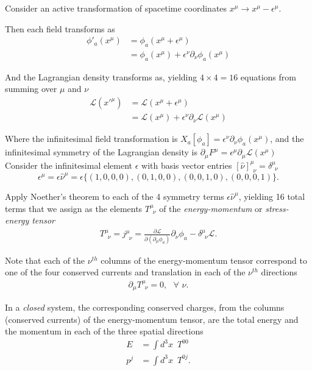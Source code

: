 \noindent Consider an active transformation of spacetime coordinates $x^\mu \rightarrow x^\mu - \epsilon^\mu$.

\noindent Then each field transforms as
\begin{align}
\phi'_a(x^\mu) &= \phi_a(x^\mu + \epsilon^\mu) \\
&= \phi_a(x^\mu) + \epsilon^\nu \partial_\nu \phi_a(x^\mu)
\end{align}

\noindent And the Lagrangian density transforms as, yielding $4 \times 4=16$ equations from summing over $\mu$ and $\nu$ 
\begin{align}
\mathscr{L}(x'^\mu) &= \mathscr{L} (x^\mu + \epsilon^\mu) \\
&= \mathscr{L}(x^\mu) + \epsilon^\nu \partial_\nu \mathscr{L}(x^\mu)
\end{align}

\noindent Where the infinitesimal field transformation is $X_a[\phi_a] = \epsilon^\nu \partial_\nu \phi_a(x^\mu)$, and the infinitesimal symmetry of the Lagrangian density is $\partial_\mu F^\mu = \epsilon^\mu \partial_\mu \mathscr{L}(x^\mu)$ \\

\noindent Consider the infinitesimal element $\epsilon$ with basis vector entries $[\hat{\nu}]^\mu_{\,\,\,\nu} = \delta^\mu_{\,\,\,\nu}$
\begin{equation}
\epsilon^\mu = \epsilon \hat{\nu}^\mu = \epsilon \{ (1,0,0,0), (0,1,0,0), (0,0,1,0), (0,0,0,1) \}.
\end{equation}

\noindent Apply Noether's theorem to each of the 4 symmetry terms $\epsilon \hat{\nu}^\mu$, yielding 16 total terms that we assign as the elements $T^\mu_{\,\,\,\nu}$ of the \textit{energy-momentum} or \textit{stress-energy tensor}
\begin{align}
T^\mu_{\,\,\,\nu} = j^\mu_{\,\,\,\nu} = \frac{\partial \mathscr{L}}{\partial (\partial_\mu \phi_a)} \partial_\nu \phi_a - \delta^\mu_{\,\,\,\nu} \mathscr{L}.
\end{align}

\noindent Note that each of the $\nu^{th}$ columns of the energy-momentum tensor correspond to one of the four conserved currents and translation in each of the $\nu^{th}$ directions
\begin{align}
\partial_\mu T^\mu_{\,\,\,\nu} = 0, \,\,\,\, \forall \,\, \nu.
\end{align}

\noindent In a \textit{closed} system, the corresponding conserved charges, from the columns (conserved currents) of the energy-momentum tensor, are the total energy and the momentum in each of the three spatial directions
\begin{align}
E &= \int d^3x \,\,\, T^{00} \\
p^j &= \int d^3x \,\,\, T^{0j} .
\end{align}

